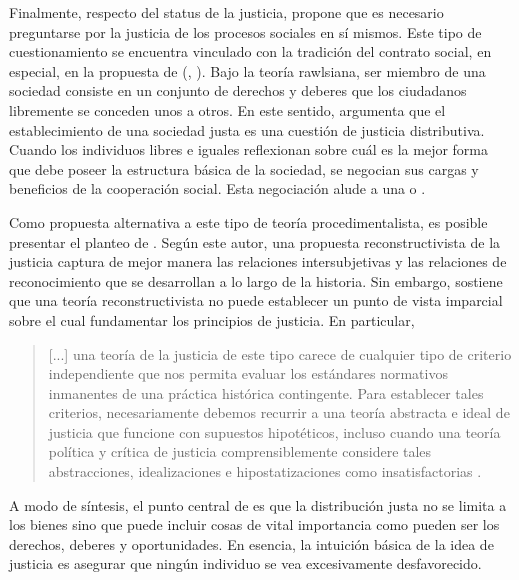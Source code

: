 Finalmente, respecto del status de la justicia, \citet{Gosepath_2013} propone que es necesario preguntarse por la justicia de los procesos sociales en sí mismos. Este tipo de cuestionamiento se encuentra vinculado con la tradición del contrato social, en especial, en la propuesta de \citeauthor{Rawls_1971} (\citeyear{Rawls_1971}, \citeyear{Rawls_2002}). Bajo la teoría rawlsiana, ser miembro de una sociedad consiste en un conjunto de derechos y deberes que los ciudadanos libremente se conceden unos a otros. En este sentido, \citet{Gosepath_2013} argumenta que el establecimiento de una sociedad justa es una cuestión de justicia distributiva. Cuando los individuos libres e iguales reflexionan sobre cuál es la mejor forma que debe poseer la estructura básica de la sociedad, se negocian sus cargas y beneficios de la cooperación social. Esta negociación alude a una  o .

Como propuesta alternativa a este tipo de teoría procedimentalista, es posible presentar el planteo de \citet{Honneth_2013}. Según este autor, una propuesta reconstructivista de la justicia captura de mejor manera las relaciones intersubjetivas y las relaciones de reconocimiento que se desarrollan a lo largo de la historia. Sin embargo, \citet{Gosepath_2013} sostiene que una teoría reconstructivista no puede establecer un punto de vista imparcial sobre el cual fundamentar los principios de justicia. En particular,

\vspace{3mm}
\begin{quote}
    [...] una teoría  de la justicia de este tipo carece de cualquier tipo de criterio independiente que nos permita evaluar los estándares normativos inmanentes de una práctica histórica contingente. Para establecer tales criterios, necesariamente debemos recurrir a una teoría abstracta e ideal de justicia que funcione con supuestos hipotéticos, incluso cuando una teoría política y crítica de justicia comprensiblemente considere tales abstracciones, idealizaciones e hipostatizaciones como insatisfactorias \citep[p. 55]{Gosepath_2013}.
\end{quote}
\vspace{3mm}

A modo de síntesis, el punto central de \citet{Gosepath_2013} es que la distribución justa no se limita a los bienes sino que puede incluir cosas de vital importancia como pueden ser los derechos, deberes y oportunidades. En esencia, la intuición básica de la idea de justicia es asegurar que ningún individuo se vea excesivamente desfavorecido.

